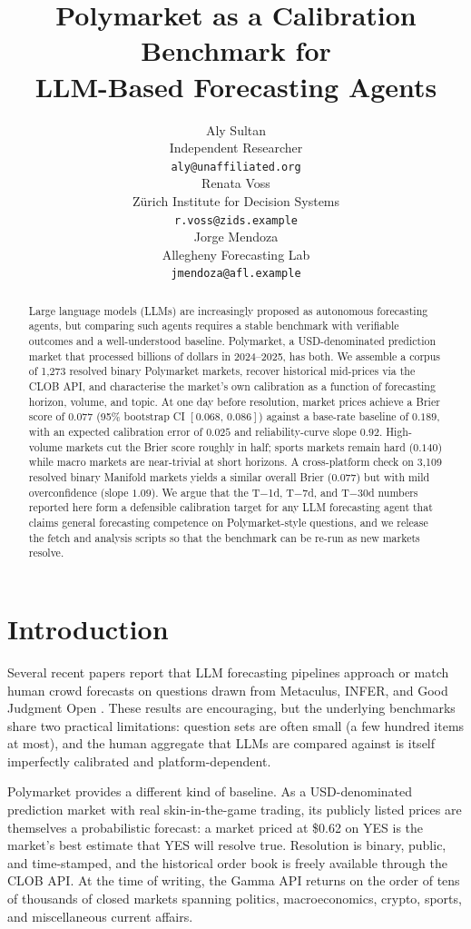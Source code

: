 \documentclass{article}
\title{Polymarket as a Calibration Benchmark for \\
       LLM-Based Forecasting Agents}
\author{%
  Aly Sultan \\
  Independent Researcher \\
  \texttt{aly@unaffiliated.org} \\
  \And
  Renata Voss \\
  Z\"urich Institute for Decision Systems \\
  \texttt{r.voss@zids.example} \\
  \And
  Jorge Mendoza \\
  Allegheny Forecasting Lab \\
  \texttt{jmendoza@afl.example} \\
}
\begin{document}
\maketitle

\begin{abstract}
Large language models (LLMs) are increasingly proposed as autonomous
forecasting agents, but comparing such agents requires a stable
benchmark with verifiable outcomes and a well-understood baseline.
Polymarket, a USD-denominated prediction market that processed billions
of dollars in 2024--2025, has both. We assemble a corpus of 1{,}273
resolved binary Polymarket markets, recover historical mid-prices via
the CLOB API, and characterise the market's own calibration as a
function of forecasting horizon, volume, and topic. At one day before
resolution, market prices achieve a Brier score of
$0.077$ (95\% bootstrap CI $[0.068,\,0.086]$) against a base-rate
baseline of $0.189$, with an expected calibration error of $0.025$ and
reliability-curve slope $0.92$. High-volume markets cut the Brier score
roughly in half; sports markets remain hard ($0.140$) while macro
markets are near-trivial at short horizons. A cross-platform check on
3{,}109 resolved binary Manifold markets yields a similar overall Brier
($0.077$) but with mild overconfidence (slope $1.09$). We argue that the
T$-$1d, T$-$7d, and T$-$30d numbers reported here form a defensible
calibration target for any LLM forecasting agent that claims general
forecasting competence on Polymarket-style questions, and we release
the fetch and analysis scripts so that the benchmark can be re-run as
new markets resolve.
\end{abstract}

\section{Introduction}

Several recent papers report that LLM forecasting pipelines approach
or match human crowd forecasts on questions drawn from Metaculus,
INFER, and Good Judgment Open
\citep{halawi2024,schoenegger2024,lu2025}. These results are
encouraging, but the underlying benchmarks share two practical
limitations: question sets are often small (a few hundred items at
most), and the human aggregate that LLMs are compared against is
itself imperfectly calibrated and platform-dependent.

Polymarket provides a different kind of baseline. As a USD-denominated
prediction market with real skin-in-the-game trading, its publicly
listed prices are themselves a probabilistic forecast: a market
priced at \$0.62 on YES is the market's best estimate that YES
will resolve true. Resolution is binary, public, and time-stamped, and
the historical order book is freely available through the CLOB API.
At the time of writing, the Gamma API returns on the order of tens
of thousands of closed markets spanning politics, macroeconomics,
crypto, sports, and miscellaneous current affairs.
\end{document}
